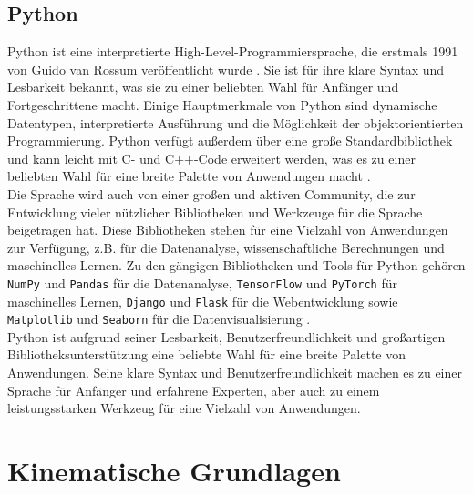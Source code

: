 \subsection{Python}\label{subsec:Python}
Python ist eine interpretierte High-Level-Programmiersprache, die erstmals 1991 von Guido van Rossum veröffentlicht wurde \cite{wiki-python}. Sie ist für ihre klare Syntax und Lesbarkeit bekannt, was sie zu einer beliebten Wahl für Anfänger und Fortgeschrittene macht. Einige Hauptmerkmale von Python sind dynamische Datentypen, interpretierte Ausführung und die Möglichkeit der objektorientierten Programmierung. Python verfügt außerdem über eine große Standardbibliothek und kann leicht mit C- und C++-Code erweitert werden, was es zu einer beliebten Wahl für eine breite Palette von Anwendungen macht \cite{offical-python}.\\
Die Sprache wird auch von einer großen und aktiven Community, die zur Entwicklung vieler nützlicher Bibliotheken und Werkzeuge für die Sprache beigetragen hat. Diese Bibliotheken stehen für eine Vielzahl von Anwendungen zur Verfügung, z.B. für die Datenanalyse, wissenschaftliche Berechnungen und maschinelles Lernen. Zu den gängigen Bibliotheken und Tools für Python gehören \texttt{NumPy} und \texttt{Pandas} für die Datenanalyse, \texttt{TensorFlow} und \texttt{PyTorch} für maschinelles Lernen, \texttt{Django} und \texttt{Flask} für die Webentwicklung sowie \texttt{Matplotlib} und \texttt{Seaborn} für die Datenvisualisierung \cite{PythonDataScienceHandbook}.\\
Python ist aufgrund seiner Lesbarkeit, Benutzerfreundlichkeit und großartigen Bibliotheksunterstützung eine beliebte Wahl für eine breite Palette von Anwendungen. Seine klare Syntax und Benutzerfreundlichkeit machen es zu einer Sprache für Anfänger und erfahrene Experten, aber auch zu einem leistungsstarken Werkzeug für eine Vielzahl von Anwendungen.\\


\section{Kinematische Grundlagen}\label{sec:KinematischeGrundlagen}

